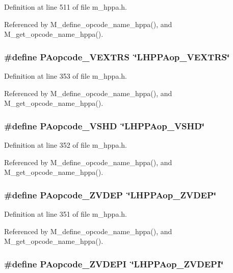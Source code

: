 Definition at line 511 of file m\_\-hppa.h.

Referenced by M\_\-define\_\-opcode\_\-name\_\-hppa(), and M\_\-get\_\-opcode\_\-name\_\-hppa().
\subsubsection{\setlength{\rightskip}{0pt plus 5cm}\#define PAopcode\_\-VEXTRS~\char`\"{}LHPPAop\_\-VEXTRS\char`\"{}}\label{m__hppa_8h_b7e6cb2f7981ac83f9734bd080d0b665}




Definition at line 353 of file m\_\-hppa.h.

Referenced by M\_\-define\_\-opcode\_\-name\_\-hppa(), and M\_\-get\_\-opcode\_\-name\_\-hppa().
\subsubsection{\setlength{\rightskip}{0pt plus 5cm}\#define PAopcode\_\-VSHD~\char`\"{}LHPPAop\_\-VSHD\char`\"{}}\label{m__hppa_8h_5ff3b475e71105767cdc2def31dd94e7}




Definition at line 352 of file m\_\-hppa.h.

Referenced by M\_\-define\_\-opcode\_\-name\_\-hppa(), and M\_\-get\_\-opcode\_\-name\_\-hppa().
\subsubsection{\setlength{\rightskip}{0pt plus 5cm}\#define PAopcode\_\-ZVDEP~\char`\"{}LHPPAop\_\-ZVDEP\char`\"{}}\label{m__hppa_8h_baabf3d0377a155724522cb55620f63f}




Definition at line 351 of file m\_\-hppa.h.

Referenced by M\_\-define\_\-opcode\_\-name\_\-hppa(), and M\_\-get\_\-opcode\_\-name\_\-hppa().
\subsubsection{\setlength{\rightskip}{0pt plus 5cm}\#define PAopcode\_\-ZVDEPI~\char`\"{}LHPPAop\_\-ZVDEPI\char`\"{}}\label{m__hppa_8h_66a34d2332cf76c05ede6203bf3a2ce0}




